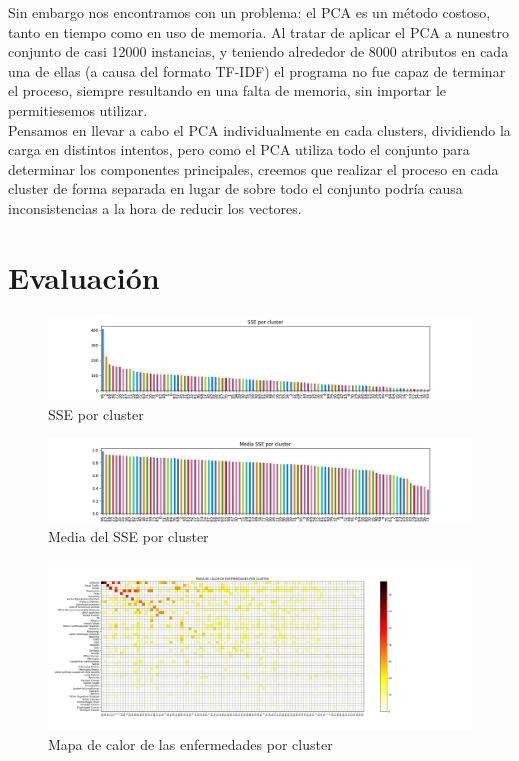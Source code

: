 \documentclass[10pt,a4paper]{article}
\begin{document}
Sin embargo nos encontramos con un problema: el PCA es un método costoso, tanto en tiempo como en uso de memoria. Al tratar de aplicar el PCA a nunestro conjunto de casi 12000 instancias, y teniendo alrededor de 8000 atributos en cada una de ellas (a causa del formato TF-IDF) el programa no fue capaz de terminar el proceso, siempre resultando en una falta de memoria, sin importar le permitiesemos utilizar.\\

Pensamos en llevar a cabo el PCA individualmente en cada clusters, dividiendo la carga en distintos intentos, pero como el PCA utiliza todo el conjunto para determinar los componentes principales, creemos que realizar el proceso en cada cluster de forma separada en lugar de sobre todo el conjunto podría causa inconsistencias a la hora de reducir los vectores.

\section{Evaluación}


\begin{figure}[h] %
  \centerline{\includegraphics[scale=.6]{figures/sse_plot.png}}
  \caption{SSE por cluster}
  \label{fig:sse_graph}
\end{figure} 

\begin{figure}[h]
  \centerline{\includegraphics[scale=.6]{figures/sse_avg_plot.png}}
  \caption{Media del SSE por cluster}
  \label{fig:sse_avg_graph}
\end{figure} 

\begin{figure}[h]
  \leftskip-3.5cm
  \includegraphics[scale=0.37]{figures/heatmap.png}
  \caption{Mapa de calor de las enfermedades por cluster}
  \label{fig:heatmap_graph}
\end{figure}
\end{document}
